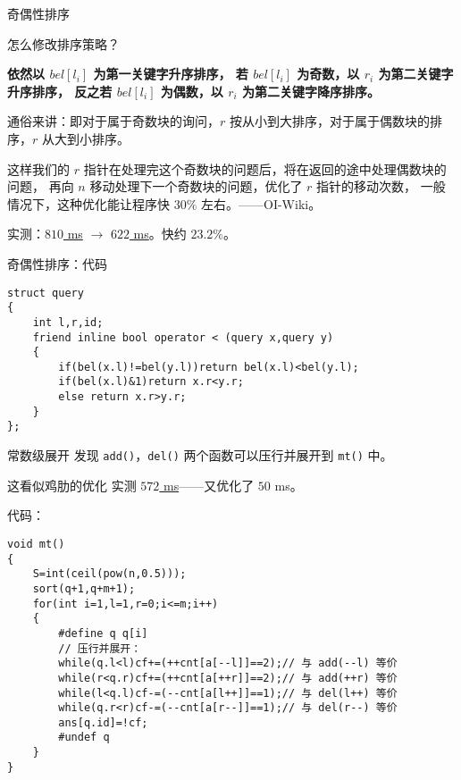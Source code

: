 \documentclass[table]{beamer}
\begin{document}
\begin{frame}{奇偶性排序}

	怎么修改排序策略？

	\textbf{依然以 $bel[l_i]$ 为第一关键字升序排序，
	若 $bel[l_i]$ 为奇数，以 $r_i$ 为第二关键字升序排序，
	反之若 $bel[l_i]$ 为偶数，以 $r_i$ 为第二关键字降序排序。}
	\pause

	通俗来讲：即对于属于奇数块的询问，$r$ 按从小到大排序，对于属于偶数块的排序，$r$ 从大到小排序。

	这样我们的 $r$ 指针在处理完这个奇数块的问题后，将在返回的途中处理偶数块的问题，
	再向 $n$ 移动处理下一个奇数块的问题，优化了 $r$ 指针的移动次数，
	一般情况下，这种优化能让程序快 $30\%$ 左右。——OI-Wiki。
	\pause

	实测：\href{https://www.luogu.com.cn/record/137463623}{\color{blue}$810$ ms} $\to$
	\href{https://www.luogu.com.cn/record/137467226}{\color{blue}$622$ ms}。快约 $23.2\%$。

\end{frame}

\begin{frame}[fragile]{奇偶性排序：代码}
\begin{verbatim}
struct query
{
    int l,r,id;
    friend inline bool operator < (query x,query y)
    {
        if(bel(x.l)!=bel(y.l))return bel(x.l)<bel(y.l);
        if(bel(x.l)&1)return x.r<y.r;
        else return x.r>y.r;
    }
};
\end{verbatim}
\end{frame}

\begin{frame}[fragile]{常数级展开}
	发现 \verb|add()|，\verb|del()| 两个函数可以压行并展开到 \verb|mt()| 中。
	
	这看似鸡肋的优化
	实测 \href{https://www.luogu.com.cn/record/137468354}{\color{blue}$572$ ms}——又优化了 $50$ ms。
	\pause

	代码：\scriptsize
\begin{verbatim}
void mt()
{
    S=int(ceil(pow(n,0.5)));
    sort(q+1,q+m+1);
    for(int i=1,l=1,r=0;i<=m;i++)
    {
        #define q q[i]
        // 压行并展开：
        while(q.l<l)cf+=(++cnt[a[--l]]==2);// 与 add(--l) 等价
        while(r<q.r)cf+=(++cnt[a[++r]]==2);// 与 add(++r) 等价
        while(l<q.l)cf-=(--cnt[a[l++]]==1);// 与 del(l++) 等价
        while(q.r<r)cf-=(--cnt[a[r--]]==1);// 与 del(r--) 等价
        ans[q.id]=!cf;
        #undef q
    }
}
\end{verbatim}
\end{frame}
\end{document}
